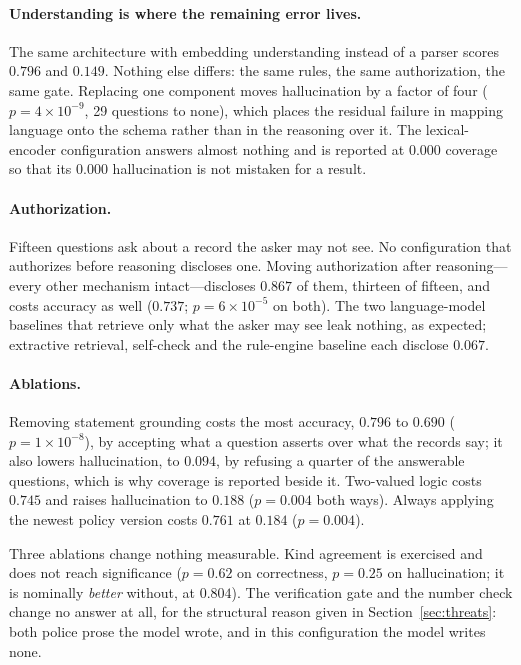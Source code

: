 \documentclass[11pt]{article}
\begin{document}
\paragraph{Understanding is where the remaining error lives.} The same architecture with
embedding understanding instead of a parser scores $0.796$ and $0.149$. Nothing else
differs: the same rules, the same authorization, the same gate. Replacing one component
moves hallucination by a factor of four ($p=4\times10^{-9}$, 29 questions to none), which
places the residual failure in mapping language onto the schema rather than in the
reasoning over it. The lexical-encoder configuration answers almost nothing and is
reported at $0.000$ coverage so that its $0.000$ hallucination is not mistaken for a
result.

\paragraph{Authorization.} Fifteen questions ask about a record the asker may not see. No
configuration that authorizes before reasoning discloses one. Moving authorization after
reasoning---every other mechanism intact---discloses $0.867$ of them, thirteen of fifteen,
and costs accuracy as well ($0.737$; $p=6\times10^{-5}$ on both). The two language-model
baselines that retrieve only what the asker may see leak nothing, as expected; extractive
retrieval, self-check and the rule-engine baseline each disclose $0.067$.

\paragraph{Ablations.} Removing statement grounding costs the most accuracy, $0.796$ to
$0.690$ ($p=1\times10^{-8}$), by accepting what a question asserts over what the records
say; it also lowers hallucination, to $0.094$, by refusing a quarter of the answerable
questions, which is why coverage is reported beside it. Two-valued logic costs $0.745$ and
raises hallucination to $0.188$ ($p=0.004$ both ways). Always applying the newest policy
version costs $0.761$ at $0.184$ ($p=0.004$).

Three ablations change nothing measurable. Kind agreement is exercised and does not reach
significance ($p=0.62$ on correctness, $p=0.25$ on hallucination; it is nominally
\emph{better} without, at $0.804$). The verification gate and the number check change no
answer at all, for the structural reason given in Section~\ref{sec:threats}: both police
prose the model wrote, and in this configuration the model writes none.
\end{document}
